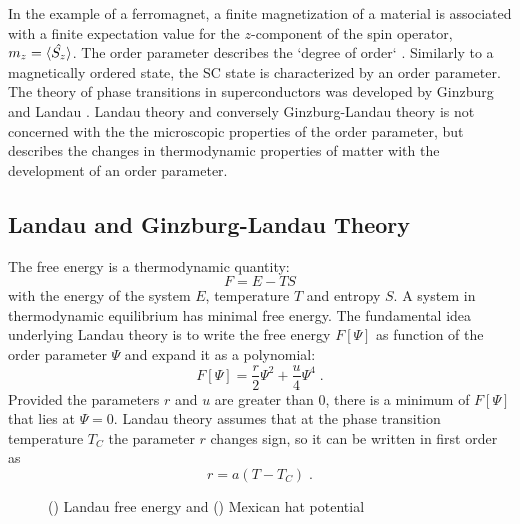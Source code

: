 \documentclass[../notes.tex]{subfiles}
\begin{document}
In the example of a ferromagnet, a finite magnetization of a material is associated with a finite expectation value for the \(z\)-component of the spin operator, \(m_z = \braket{\hat{S_z}}\).
The order parameter describes the `degree of order` \cite{landauTheoryPhaseTransitions1937}.
Similarly to a magnetically ordered state, the SC state is characterized by an order parameter.
The theory of phase transitions in superconductors was developed by Ginzburg and Landau \cite{ginzburgTheorySuperconductivity1950}.
Landau theory and conversely Ginzburg-Landau theory is not concerned with the the microscopic properties of the order parameter, but describes the changes in thermodynamic properties of matter with the development of an order parameter.

\subsection{Landau and Ginzburg-Landau Theory}\label{sub:Landau and Ginzburg-Landau Theory}

The free energy is a thermodynamic quantity:
\begin{equation}
	F = E - T S
\end{equation}
with the energy of the system \(E\), temperature \(T\) and entropy \(S\).
A system in thermodynamic equilibrium has minimal free energy.
The fundamental idea underlying Landau theory is to write the free energy \(F[\Psi]\) as function of the order parameter \(\Psi\) and expand it as a polynomial:
\begin{equation}
	F[\Psi] = \frac{r}{2} \Psi^2 + \frac{u}{4} \Psi^4 \;.
\end{equation}
Provided the parameters \(r\) and \(u\) are greater than \(0\), there is a minimum of \(F[\Psi]\) that lies at \(\Psi = 0\).
Landau theory assumes that at the phase transition temperature \(T_C\) the parameter \(r\) changes sign, so it can be written in first order as
\begin{equation}
	r = a(T - T_C) \;.
\end{equation}

\begin{figure}[t]
	\centering
	\begin{subfigure}[b]{0.5\textwidth}
		\centering
		
		\caption{\label{sfig:Landau free energy}}
	\end{subfigure}%
	\begin{subfigure}[b]{0.5\textwidth}
		\centering
		
		\caption{\label{sfig:Ginzburg Landau free energy}}
	\end{subfigure}
	\caption{() Landau free energy and () Mexican hat potential} 
	\label{fig:Landau free energy and Ginzburg-Landau free energy}
\end{figure}
\end{document}
